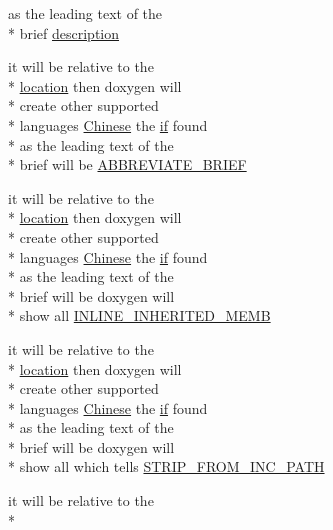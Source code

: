 \begin{DoxyCompactItemize}
as the leading text of the \\*
brief \hyperlink{sdlgamepad_8dox_ae82208d022e4246ddf1e4f481a3f81b0}{description}
\item 
it will be relative to the \\*
\hyperlink{glext_8h_a6f0165ed903f22b8bb600c3e0b628e73}{location} then doxygen will \\*
create other supported \\*
languages \hyperlink{sdlgamepad_8dox_ab6ff97d2e5e9fa61c208d5f0eee91c62}{Chinese} the \hyperlink{qxtdiscoverableservice_8cpp_aa620047247d7e2a6894ad8ad666771de}{if} found \\*
as the leading text of the \\*
brief will be \hyperlink{sdlgamepad_8dox_a122d2428a3db9b3f12d65d76f35275b8}{A\-B\-B\-R\-E\-V\-I\-A\-T\-E\-\_\-\-B\-R\-I\-E\-F}
\item 
it will be relative to the \\*
\hyperlink{glext_8h_a6f0165ed903f22b8bb600c3e0b628e73}{location} then doxygen will \\*
create other supported \\*
languages \hyperlink{sdlgamepad_8dox_ab6ff97d2e5e9fa61c208d5f0eee91c62}{Chinese} the \hyperlink{qxtdiscoverableservice_8cpp_aa620047247d7e2a6894ad8ad666771de}{if} found \\*
as the leading text of the \\*
brief will be doxygen will \\*
show all \hyperlink{sdlgamepad_8dox_a917faf68b4323d3cbd972106282ca4e7}{I\-N\-L\-I\-N\-E\-\_\-\-I\-N\-H\-E\-R\-I\-T\-E\-D\-\_\-\-M\-E\-M\-B}
\item 
it will be relative to the \\*
\hyperlink{glext_8h_a6f0165ed903f22b8bb600c3e0b628e73}{location} then doxygen will \\*
create other supported \\*
languages \hyperlink{sdlgamepad_8dox_ab6ff97d2e5e9fa61c208d5f0eee91c62}{Chinese} the \hyperlink{qxtdiscoverableservice_8cpp_aa620047247d7e2a6894ad8ad666771de}{if} found \\*
as the leading text of the \\*
brief will be doxygen will \\*
show all which tells \hyperlink{sdlgamepad_8dox_a6d297e0f2850b59accd7903a23e2ecff}{S\-T\-R\-I\-P\-\_\-\-F\-R\-O\-M\-\_\-\-I\-N\-C\-\_\-\-P\-A\-T\-H}
\item 
it will be relative to the \\*

\end{DoxyCompactItemize}

